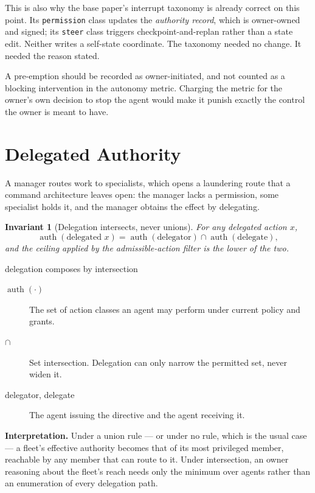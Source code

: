 \documentclass[11pt]{article}
\newtheorem{invariant}{Invariant}
\newcommand{\op}[1]{\operatorname{#1}}
\begin{document}
This is also why the base paper's interrupt taxonomy is already correct on this point. Its \texttt{permission} class updates the \emph{authority record}, which is owner-owned and signed; its \texttt{steer} class triggers checkpoint-and-replan rather than a state edit. Neither writes a self-state coordinate. The taxonomy needed no change. It needed the reason stated.

A pre-emption should be recorded as owner-initiated, and not counted as a blocking intervention in the autonomy metric. Charging the metric for the owner's own decision to stop the agent would make it punish exactly the control the owner is meant to have.

\section{Delegated Authority}
\label{sec:delegation}

A manager routes work to specialists, which opens a laundering route that a command architecture leaves open: the manager lacks a permission, some specialist holds it, and the manager obtains the effect by delegating.

\begin{invariant}[Delegation intersects, never unions]
\label{inv:intersect}
For any delegated action $x$,
\begin{equation}
\op{auth}(\text{delegated }x)=\op{auth}(\text{delegator})\cap\op{auth}(\text{delegate}),
\label{eq:intersect}
\end{equation}
and the ceiling applied by the admissible-action filter is the lower of the two.
\end{invariant}

\begin{equationguide}{delegation composes by intersection}
\begin{description}
\item[{$\op{auth}(\cdot)$}] The set of action classes an agent may perform under current policy and grants.
\item[{$\cap$}] Set intersection. Delegation can only narrow the permitted set, never widen it.
\item[{delegator, delegate}] The agent issuing the directive and the agent receiving it.
\end{description}
\textbf{Interpretation.} Under a union rule --- or under no rule, which is the usual case --- a fleet's effective authority becomes that of its most privileged member, reachable by any member that can route to it. Under intersection, an owner reasoning about the fleet's reach needs only the minimum over agents rather than an enumeration of every delegation path.
\end{equationguide}
\end{document}
